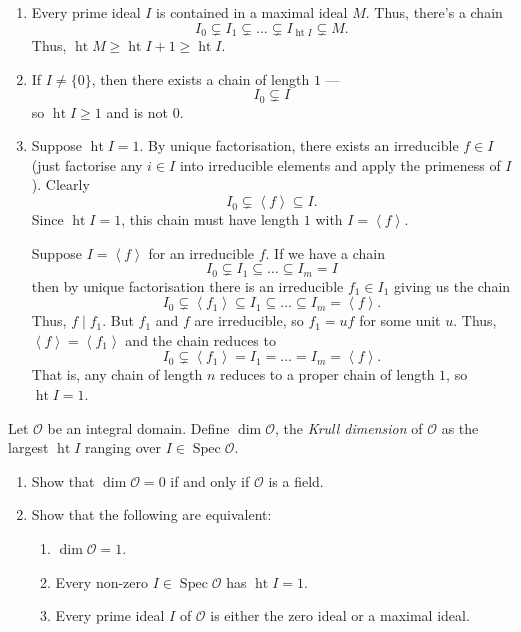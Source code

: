 \documentclass[12 pt, letterpaper]{hmcpset}
\begin{document}
\begin{solution}
	\begin{enumerate}
		\item Every prime ideal $I$ is contained in a maximal ideal $M$. Thus, there's a chain
			\[
				I_{0} \subsetneq I_{1} \subsetneq \dots \subsetneq I_{\operatorname{ht} I} \subsetneq M.
			\]
			Thus, $\operatorname{ht} M \ge \operatorname{ht} I + 1 \ge \operatorname{ht} I$.
		\item If $I \neq \{ 0 \}$, then there exists a chain of length $1$ ---
			\[
				I_{0} \subsetneq I	
			\]
			so $\operatorname{ht} I \ge 1$ and is not $0$.
		\item Suppose $\operatorname{ht} I = 1$. By unique factorisation, there exists an irreducible $f \in I$ (just factorise any $i \in I$ into irreducible elements and apply the primeness of $I$). Clearly
			\[
				I_{0} \subsetneq \left < f \right > \subseteq I.
			\]
			Since $\operatorname{ht} I = 1$, this chain must have length $1$ with $I = \left < f \right >$.

			Suppose $I = \left < f \right >$ for an irreducible $f$. If we have a chain
			\[
				I_{0} \subsetneq I_{1} \subseteq \dots \subseteq I_{m} = I
			\]
			then by unique factorisation there is an irreducible $f_{1} \in I_{1}$ giving us the chain
			\[
				I_{0} \subsetneq \left < f_{1} \right > \subseteq I_{1} \subseteq \dots \subseteq I_{m} = \left < f \right >.
			\]
			Thus, $f \mid f_{1}$. But $f_{1}$ and $f$ are irreducible, so $f_{1} = u f$ for some unit $u$. Thus, $\left < f \right > = \left < f_{1} \right >$ and the chain reduces to
			\[
				I_{0} \subsetneq \left < f_{1} \right > = I_{1} = \dots = I_{m} = \left < f \right >.
			\]
			That is, any chain of length $n$ reduces to a proper chain of length $1$, so $\operatorname{ht} I = 1$.
	\end{enumerate}
\end{solution}

\pagebreak

\begin{problem}[Problem 3.]
	Let $\mathcal{O}$ be an integral domain. Define $\operatorname{dim} \mathcal{O}$, the \emph{Krull dimension} of $\mathcal{O}$ as the largest $\operatorname{ht} I$ ranging over $I \in \operatorname{Spec} \mathcal{O}$.
	\begin{enumerate}
		\item Show that $\dim \mathcal{O} = 0$ if and only if $\mathcal{O}$ is a field.
		\item Show that the following are equivalent:
			\begin{enumerate}[label = (\roman*)]
				\item $\dim \mathcal{O} = 1$.
				\item Every non-zero $I \in \operatorname{Spec} \mathcal{O}$ has $\operatorname{ht} I = 1$.
				\item Every prime ideal $I$ of $\mathcal{O}$ is either the zero ideal or a maximal ideal.
			\end{enumerate}
	\end{enumerate}
\end{problem}
\end{document}
